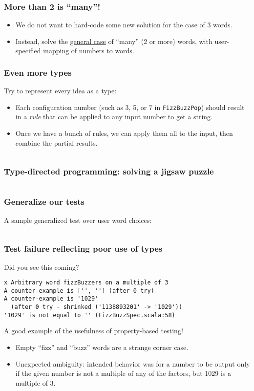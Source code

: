 \begin{frame}
  \frametitle{More than 2 is ``many''!}

  \begin{itemize}
  \item We do not want to hard-code some new solution for the case of 3 words.
  \item Instead, solve the \href{http://c2.com/cgi/wiki?ZeroOneInfinityRule}{general case} of ``many'' (2 or more) words, with user-specified mapping of numbers to words.
  \end{itemize}
\end{frame}

\begin{frame}[fragile]
  \frametitle{Even more types}

  Try to represent every idea as a type:
  \begin{itemize}
  \item Each configuration number (such as 3, 5, or 7 in \texttt{FizzBuzzPop}) should result in a \emph{rule} that can be applied to any input number to get a string.
  \item Once we have a bunch of rules, we can apply them all to the input, then combine the partial results.
  \end{itemize}

  \inputminted{scala}{FizzBuzz4.scala}
\end{frame}

\begin{frame}[fragile]
  \frametitle{Type-directed programming: solving a jigsaw puzzle}

  \inputminted{scala}{FizzBuzz5.scala}
\end{frame}

\begin{frame}[fragile]
  \frametitle{Generalize our tests}

  A sample generalized test over user word choices:
  \inputminted{scala}{FizzBuzzSpec6.scala}
\end{frame}

\begin{frame}[fragile]
  \frametitle{Test failure reflecting poor use of types}

  Did you see this coming?
  \begin{verbatim}
x Arbitrary word fizzBuzzers on a multiple of 3
A counter-example is ['', ''] (after 0 try)
A counter-example is '1029'
  (after 0 try - shrinked ('1138893201' -> '1029'))
'1029' is not equal to '' (FizzBuzzSpec.scala:58)
  \end{verbatim}

  A good example of the usefulness of property-based testing!
  \begin{itemize}
  \item Empty ``fizz'' and ``buzz'' words are a strange corner case.
  \item Unexpected ambiguity: intended behavior was for a number to be output only if the given number is not a multiple of any of the factors, but 1029 is a multiple of 3.
  \end{itemize}
\end{frame}

